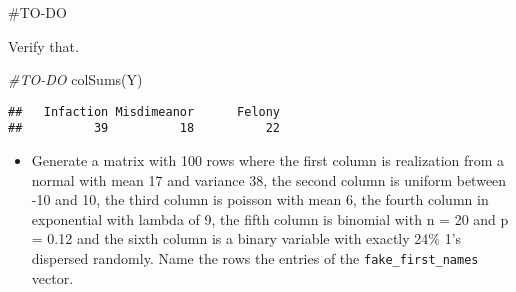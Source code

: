 \documentclass[
]{article}
\newenvironment{Shaded}{\begin{snugshade}}{\end{snugshade}}
\newcommand{\CommentTok}[1]{\textcolor[rgb]{0.56,0.35,0.01}{\textit{#1}}}
\newcommand{\FunctionTok}[1]{\textcolor[rgb]{0.00,0.00,0.00}{#1}}
\newcommand{\NormalTok}[1]{#1}
\providecommand{\tightlist}{%
  \setlength{\itemsep}{0pt}\setlength{\parskip}{0pt}}
\begin{document}
\#TO-DO

Verify that.

\begin{Shaded}
\begin{Highlighting}[]
\CommentTok{\#TO{-}DO}
\FunctionTok{colSums}\NormalTok{(Y)}
\end{Highlighting}
\end{Shaded}

\begin{verbatim}
##   Infaction Misdimeanor      Felony 
##          39          18          22
\end{verbatim}

\begin{itemize}
\tightlist
\item
  Generate a matrix with 100 rows where the first column is realization
  from a normal with mean 17 and variance 38, the second column is
  uniform between -10 and 10, the third column is poisson with mean 6,
  the fourth column in exponential with lambda of 9, the fifth column is
  binomial with n = 20 and p = 0.12 and the sixth column is a binary
  variable with exactly 24\% 1's dispersed randomly. Name the rows the
  entries of the \texttt{fake\_first\_names} vector.
\end{itemize}
\end{document}
